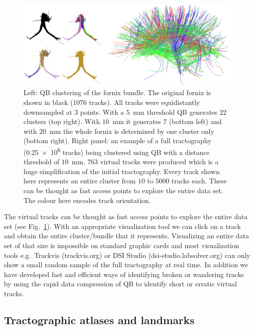 \documentclass{bioinfo}
\begin{document}
\begin{figure}
\begin{centering}
\includegraphics[scale=0.45]{Figures/Fig_6_QB_simple}
\par\end{centering}
\caption{Left: QB clustering of the fornix bundle. The original fornix
  is shown in black ($1076$ tracks). All tracks were equidistantly
  downsampled at $3$ points. With a $5$~mm threshold QB generates $22$
  clusters (top right). With $10$~mm it generates $7$ (bottom left) and
  with $20$~mm the whole fornix is determined by one cluster only
  (bottom right). Right panel: an example of a full tractography
  (\num{0.25e6} tracks) being clustered using QB with a distance
  threshold of $10$~mm. $763$ virtual tracks were produced which is a
  huge simplification of the initial tractography. Every track shown
  here represents an entire cluster from $10$ to $5000$ tracks
  each. These can be thought as fast access points to explore the entire
  data set. The colour here encodes track
  orientation.\label{Flo:QB_fornix}}
\centering{}
\end{figure}

The virtual tracks can be thought as fast access points to explore the
entire data set (see Fig.~\ref{Flo:QB_fornix}). With an appropriate
visualization tool we can click on a track and obtain the entire
cluster/bundle that it represents. Visualizing an entire data set of
that size is impossible on standard graphic cards and most visualization
tools e.g.~Trackvis (trackvis.org) or DSI Studio
(dsi-studio.labsolver.org) can only show a small random sample of the
full tractography at real time. In addition we have developed fast and
efficient ways of identifying broken or wandering tracks by using the
rapid data compression of QB to identify short or erratic virtual
tracks.

\subsection{Tractographic atlases and landmarks\label{sub:Atlases-made-easy}}
\end{document}
